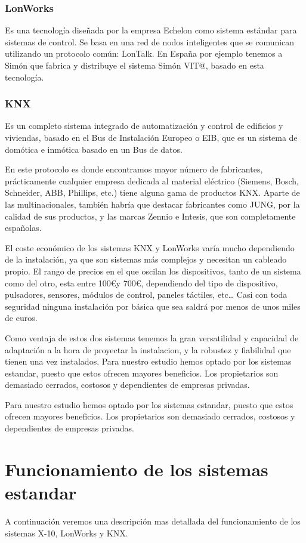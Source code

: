 \subsubsection{LonWorks}
Es una tecnología diseñada por la empresa Echelon como sistema
est\'andar para sistemas de control. Se basa en una red de nodos inteligentes
que se comunican utilizando un protocolo común: LonTalk.
En España por ejemplo tenemos a Simón que fabrica y distribuye el
sistema Simón VIT@, basado en esta tecnología.

\subsubsection{KNX}
Es un completo sistema integrado de automatización y control de
edificios y viviendas, basado en el Bus de Instalación Europeo o EIB, que es un
sistema de domótica e inmótica basado en un Bus de datos.


En este protocolo es donde encontramos mayor número de fabricantes,
pr\'acticamente cualquier empresa dedicada al material eléctrico (Siemens,
Bosch, Schneider, ABB, Phillips, etc.) tiene alguna gama de productos KNX.
Aparte de las multinacionales, también habría que destacar fabricantes como
JUNG, por la calidad de sus productos, y las marcas Zennio e Intesis, que son
completamente españolas.


El coste económico de los sistemas KNX y LonWorks varía mucho
dependiendo de la instalación, ya que son sistemas m\'as complejos y necesitan
un cableado propio. El rango de precios en el que oscilan los dispositivos, tanto
de un sistema como del otro, esta entre 100\euro y 700\euro, dependiendo del tipo de
dispositivo, pulsadores, sensores, módulos de control, paneles t\'actiles, etc…
Casi con toda seguridad ninguna instalación por b\'asica que sea saldr\'a por
menos de unos miles de euros. 

Como ventaja de estos dos sistemas tenemos
la gran versatilidad y capacidad de adaptación a la hora de proyectar la
instalacion, y la robustez y fiabilidad que tienen una vez instalados.
Para nuestro estudio hemos optado por los sistemas estandar, puesto
que estos ofrecen mayores beneficios. Los propietarios son demasiado
cerrados, costosos y dependientes de empresas privadas.

Para nuestro estudio hemos optado por los sistemas estandar, puesto
que estos ofrecen mayores beneficios. Los propietarios son demasiado
cerrados, costosos y dependientes de empresas privadas.

\section{Funcionamiento de los sistemas estandar}
A continuación veremos una descripción mas detallada del
funcionamiento de los sistemas X-10, LonWorks y KNX.
